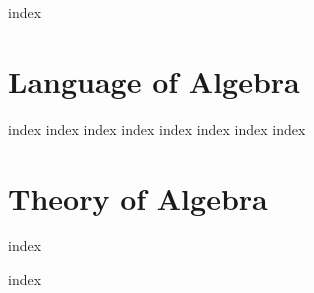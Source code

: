 \documentclass[12pt,twoside,letterpaper]{memoir}
\begin{document}
% 
\cleardoublepage


\mainmatter%


{index}

\part{Language of Algebra}
{index}
{index}
{index}
{index}
{index}
{index}
{index}
{index}








\part{Theory of Algebra}

{index}

{index}
\end{document}
